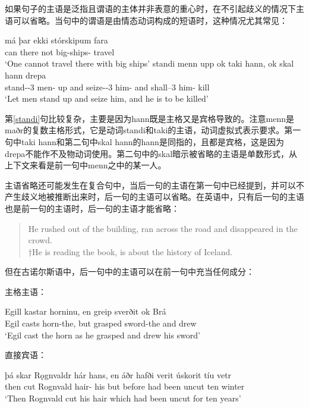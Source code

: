 \begin{enumerate}
          如果句子的主语是泛指且谓语的主体并非表意的重心时，在不引起歧义的情况下主语可以省略。当句中的谓语是由情态动词构成的短语时，这种情况尤其常见：
          \begin{exe}
              \ex \gll
              má	þar	ekki	stórskipum	fara\\
              can	there	not	big-ships-{\dat}	travel\\
              \trans `One cannot travel there with big ships’
              \ex \label{standi} \gll
              standi	menn	upp	ok	taki	hann, ok	skal	hann	drepa	\\
              stand-\sub -{\footnotesize 3} \pl	men-{\nom}	up	and	seize-\sub -{\footnotesize 3} \pl	him-{\acc} and	shall--{\footnotesize 3} {\sing}	him-{\acc}	kill		\\
              \trans `Let men stand up and seize him, and he is to be killed’
          \end{exe}

          第\ref{standi}句比较复杂，主要是因为hann既是主格又是宾格导致的。注意menn是maðr的复数主格形式，它是动词standi和taki的主语，动词虚拟式表示要求。第一句中taki hann和第二句中skal hann的hann是同指的，且都是宾格，这是因为drepa不能作不及物动词使用。第二句中的skal暗示被省略的主语是单数形式，从上下文来看是前一句中menn之中的某一人。

          主语省略还可能发生在复合句中，当后一句的主语在第一句中已经提到，并可以不产生歧义地被推断出来时，后一句的主语可以省略。在英语中，只有后一句的主语也是前一句的主语时，后一句的主语才能省略：
          \begin{quote}
              He rushed out of the building, ran across the road and disappeared in the crowd.\\
              †He is reading the book, is about the history of Iceland.
          \end{quote}

          但在古诺尔斯语中，后一句中的主语可以在前一句中充当任何成分：

          主格主语：
          \begin{exe}
              \ex \gll Egill	kastar	horninu,	en	greip	sverðit	ok	Brá\\
              Egil	casts	horn-the,	but	grasped	sword-the	and	drew\\

              \trans `Egil cast the horn as he grasped and drew his sword’
          \end{exe}

          直接宾语：
          \begin{exe}
              \ex \gll þá	skar	Rǫgnvaldr	hár	hans,	en	áðr	hafði verit	úskorit	tíu	vetr\\
              then	cut	Rognvald	hair-{\acc}	his	but	before	had been	uncut	ten	winter	\\		 \trans`Then Rognvald cut his hair which had been uncut for ten years’
          \end{exe}


\end{enumerate}
